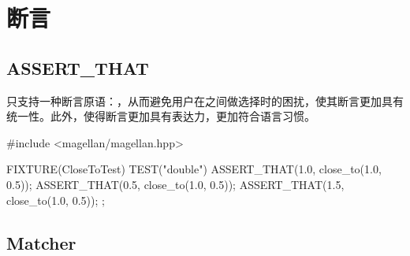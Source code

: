 \begin{savequote}[45mm]
\end{savequote}

\chapter{断言} 
\label{ch:assert-that}

\section{ASSERT\_THAT}

\begin{content}

只支持一种断言原语：，从而避免用户在之间做选择时的困扰，使其断言更加具有统一性。此外，使得断言更加具有表达力，更加符合语言习惯。

\begin{leftbar}
\begin{c++}[caption={test/hamcrest/CloseToTest.cpp}]
#include <magellan/magellan.hpp>

FIXTURE(CloseToTest)
{
    TEST("double")
    {
        ASSERT_THAT(1.0, close_to(1.0, 0.5));
        ASSERT_THAT(0.5, close_to(1.0, 0.5));
        ASSERT_THAT(1.5, close_to(1.0, 0.5));
    }
};
\end{c++}
\end{leftbar}

\end{content}

\section{Matcher}


